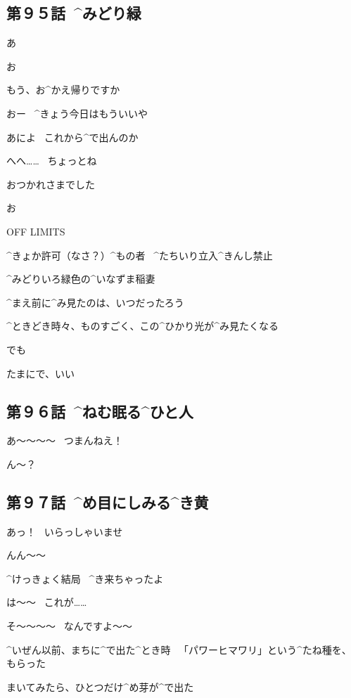 \subsection{第９５話\ ^{みどり}{緑}}

\page[107]
\Alpha あ

\Ojisan お

\Alpha もう、お^{かえ}{帰}りですか

\Ojisan おー
\ ^{きょう}{今日}はもういいや

\Ojisan あによ
\ これから^{で}{出}んのか

\Alpha へへ……
\ ちょっとね

\Alpha おつかれさまでした

\Ojisan お

\page[111]
\Sign OFF LIMITS

\Sign ^{きょか}{許可}（なさ？）^{もの}{者}
\ ^{たちいり}{立入}^{きんし}{禁止}

\page
\Alpha ^{みどりいろ}{緑色}の^{いなずま}{稲妻}

\Alpha ^{まえ}{前}に^{み}{見}たのは、いつだったろう

\page
\Alpha ^{ときどき}{時々}、ものすごく、この^{ひかり}{光}が^{み}{見}たくなる

\Alpha でも

\Alpha たまにで、いい


\subsection{第９６話\ ^{ねむ}{眠}る^{ひと}{人}}

\page[118]
\Makki あ〜〜〜〜
\ つまんねえ！

\Takahiro ん〜？


\subsection{第９７話\ ^{め}{目}にしみる^{き}{黄}}

\page[127]
\Alpha あっ！
\ いらっしゃいませ

\Person んん〜〜

\Person ^{けっきょく}{結局}
\ ^{き}{来}ちゃったよ

\Person は〜〜
\ これが……

\Alpha そ〜〜〜〜
\ なんですよ〜〜

\page[129]
\Alpha ^{いぜん}{以前}、まちに^{で}{出}た^{とき}{時}
\ 「パワーヒマワリ」という^{たね}{種}を、もらった

\Alpha まいてみたら、ひとつだけ^{め}{芽}が^{で}{出}た

